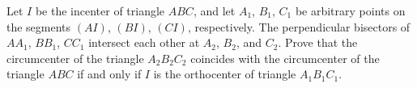 Let $ I$ be the incenter of triangle $ ABC$, and let $ A_1$, $ B_1$, $ C_1$ be arbitrary points on the segments $ (AI)$, $ (BI)$, $ (CI)$, respectively. The perpendicular bisectors of $ AA_1$, $ BB_1$, $ CC_1$ intersect each other at $ A_2$, $ B_2$, and $ C_2$. Prove that the circumcenter of the triangle $ A_2B_2C_2$ coincides with the circumcenter of the triangle $ ABC$ if and only if $ I$ is the orthocenter of triangle $ A_1B_1C_1$.